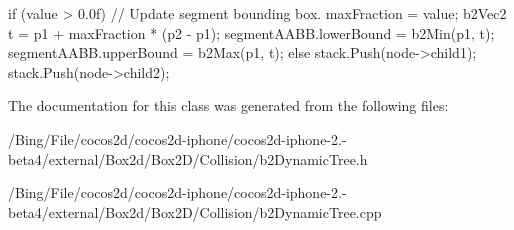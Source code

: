 \begin{DoxyCode}
{{{                        if (value > 0.0f)
                        {
                                // Update segment bounding box.
                                maxFraction = value;
                                b2Vec2 t = p1 + maxFraction * (p2 - p1);
                                segmentAABB.lowerBound = b2Min(p1, t);
                                segmentAABB.upperBound = b2Max(p1, t);
                        }
                }
                else
                {
                        stack.Push(node->child1);
                        stack.Push(node->child2);
                }
        }
}
\end{DoxyCode}


The documentation for this class was generated from the following files\-:\begin{DoxyCompactItemize}
\item 
/\-Bing/\-File/cocos2d/cocos2d-\/iphone/cocos2d-\/iphone-\/2.-\/beta4/external/\-Box2d/\-Box2\-D/\-Collision/b2\-Dynamic\-Tree.\-h\item 
/\-Bing/\-File/cocos2d/cocos2d-\/iphone/cocos2d-\/iphone-\/2.-\/beta4/external/\-Box2d/\-Box2\-D/\-Collision/b2\-Dynamic\-Tree.\-cpp\end{DoxyCompactItemize}
